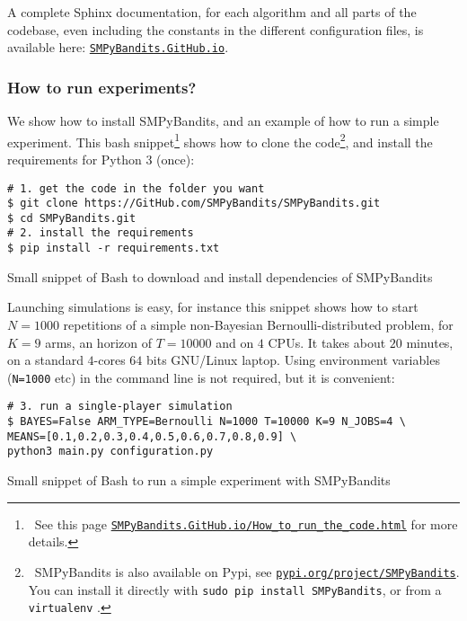 A complete Sphinx documentation, for each algorithm and all parts of the codebase, even including the constants in the different configuration files, is available here: \texttt{\href{https://SMPyBandits.GitHub.io}{SMPyBandits.GitHub.io}}.


\subsubsection{How to run experiments?}

We show how to install SMPyBandits, and an example of how to run a simple experiment.
This bash snippet\footnote{~See this page \texttt{\href{https://SMPyBandits.GitHub.io/How_to_run_the_code.html}{SMPyBandits.GitHub.io/How\_to\_run\_the\_code.html}} for more details.} shows how to clone the code\footnote{~SMPyBandits is also available on Pypi, see \texttt{\href{https://pypi.org/project/SMPyBandits/}{pypi.org/project/SMPyBandits}}. You can install it directly with \texttt{sudo pip install SMPyBandits}, or from a \texttt{virtualenv} \cite{virtualenv}.},
and install the requirements for Python 3 (once):

\begin{small}
    \begin{listing}[h!]
        \begin{verbatim}
# 1. get the code in the folder you want
$ git clone https://GitHub.com/SMPyBandits/SMPyBandits.git
$ cd SMPyBandits.git
# 2. install the requirements
$ pip install -r requirements.txt
        \end{verbatim}
        \caption{Small snippet of Bash to download and install dependencies of SMPyBandits}
        \label{lst:3:howToInstallLibrary}
    \end{listing}
\end{small}

Launching simulations is easy, for instance this snippet shows how to start $N=1000$ repetitions of a simple non-Bayesian Bernoulli-distributed problem, for $K=9$ arms, an horizon of $T=10000$ and on $4$ CPUs.
It takes about $20$ minutes, on a standard $4$-cores $64$ bits GNU/Linux laptop.
Using environment variables (\texttt{N=1000} etc) in the command line is not required, but it is convenient:

\begin{listing}[h!]
    \begin{verbatim}
# 3. run a single-player simulation
$ BAYES=False ARM_TYPE=Bernoulli N=1000 T=10000 K=9 N_JOBS=4 \
MEANS=[0.1,0.2,0.3,0.4,0.5,0.6,0.7,0.8,0.9] \
python3 main.py configuration.py
    \end{verbatim}
    \caption{Small snippet of Bash to run a simple experiment with SMPyBandits}
    \label{lst:3:howToRunBasicLibrary}
\end{listing}


